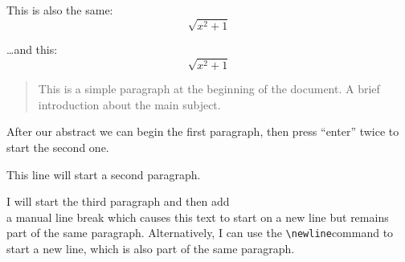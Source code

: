 \documentclass{article}
\begin{document}
This is also the same:
\begin{displaymath}
    \sqrt{x^2+1}
\end{displaymath}

\ldots and this:
\begin{equation*}
    \sqrt{x^2+1}
\end{equation*}


\begin{abstract}
    This is a simple paragraph at the beginning of the
    document. A brief introduction about the main subject.
\end{abstract}

After our abstract we can begin the first paragraph, then press ``enter'' twice to start the second one.

This line will start a second paragraph.

I will start the third paragraph and then add \\ a manual line break which causes this text to start on a new line but remains part of the same paragraph. Alternatively, I can use the \verb|\newline|\newline command to start a new line, which is also part of the same paragraph.
\end{document}

